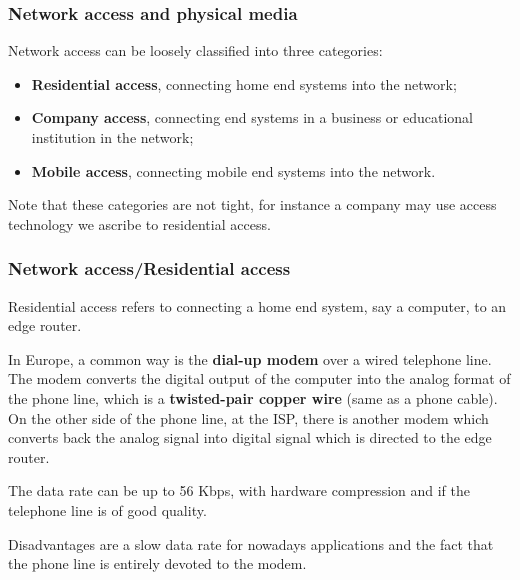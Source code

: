 %
\begin{frame}
\frametitle{Network access and physical media}

Network access can be loosely classified into three categories:
\begin{itemize}

  \item \textbf{Residential access}, connecting home end systems into
  the network;

  \item \textbf{Company access}, connecting end systems in a business
  or educational institution in the network;

  \item \textbf{Mobile access}, connecting mobile end systems into
  the network.

\end{itemize}
Note that these categories are not tight, for instance a company may
use access technology we ascribe to residential access.

\end{frame}

%
\begin{frame}
\frametitle{Network access/Residential access}

Residential access refers to connecting a home end system, say a
computer, to an edge router.

\bigskip

In Europe, a common way is the \textbf{dial-up modem} over a wired
telephone line. The modem converts the digital output of the computer
into the analog format of the phone line, which is a
\textbf{twisted-pair copper wire} (same as a phone cable). On the
other side of the phone line, at the ISP, there is another modem which
converts back the analog signal into digital signal which is directed
to the edge router.

\bigskip

The data rate can be up to 56 Kbps, with hardware compression and if
the telephone line is of good quality.

\bigskip

Disadvantages are a slow data rate for nowadays applications and the
fact that the phone line is entirely devoted to the modem.

\end{frame}

